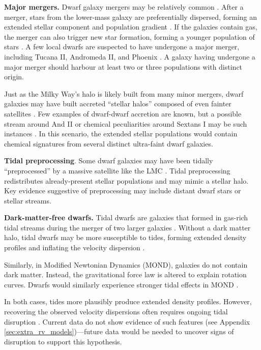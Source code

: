 \textbf{Major mergers.} Dwarf galaxy mergers may be relatively common
\citep{deason+wetzel+garrison-kimmel2014}. After a merger, stars from
the lower-mass galaxy are preferentially dispersed, forming an extended
stellar component and population gradient
\citep{benitez-llambay+2016, deason+2022}. If the galaxies contain gas,
the merger can also trigger new star formation, forming a younger
population of stars \citep[e.g.,][]{genina+2019}. A few local dwarfs are
suspected to have undergone a major merger, including Tucana II,
Andromeda II, and Phoenix
\citep{lokas+2014, fouquet+2017, tarumi+yoshida+frebel2021, cardona-barrero+2021, querci+2025}.
A galaxy having undergone a major merger should harbour at least two or
three populations with distinct origin.

Just as the Milky Way's halo is likely built from many minor mergers,
dwarf galaxies may have built accreted ``stellar halos'' composed of
even fainter satellites \citep{ricotti+polisensky+cleland2022}. Few
examples of dwarf-dwarf accretion are known, but a possible stream
around And II or chemical peculiarities around Sextans I may be such
instances \citep{amorisco+evans+vandeven2014, roederer+2023}. In this
scenario, the extended stellar populations would contain chemical
signatures from several distinct ultra-faint dwarf galaxies.

\textbf{Tidal preprocessing}. Some dwarf galaxies may have been tidally
``preprocessed'' by a massive satellite like the LMC
\citep[e.g.,][]{santistevan+2023, riley+2024}. Tidal preprocessing
redistributes already-present stellar populations and may mimic a
stellar halo. Key evidence suggestive of preprocessing may include
distant dwarf stars or stellar streams.

\textbf{Dark-matter-free dwarfs.} Tidal dwarfs are galaxies that formed
in gas-rich tidal streams during the merger of two larger galaxies
\citep[e.g.,][]{mirabel+dottori+lutz1992, bournaud+duc2006}. Without a
dark matter halo, tidal dwarfs may be more susceptible to tides, forming
extended density profiles and inflating the velocity dispersion
\citep{casas+2012, yang+2014, wang+2024a}.

Similarly, in Modified Newtonian Dynamics (MOND), galaxies do not
contain dark matter. Instead, the gravitational force law is altered to
explain rotation curves. Dwarfs would similarly experience stronger
tidal effects in MOND \citep{mcgaugh+wolf2010, brada+milgrom2000}.

In both cases, tides more plausibly produce extended density profiles.
However, recovering the observed velocity dispersions often requires
ongoing tidal disruption
\citetext{\citealp{mcgaugh+wolf2010}; \citealp[but see
also][]{sanchez-salcedo+hernandez2007}}. Current data do not show
evidence of such features (see Appendix
\ref{sec:extra_rv_models})---future data would be needed to uncover
signs of disruption to support this hypothesis.

